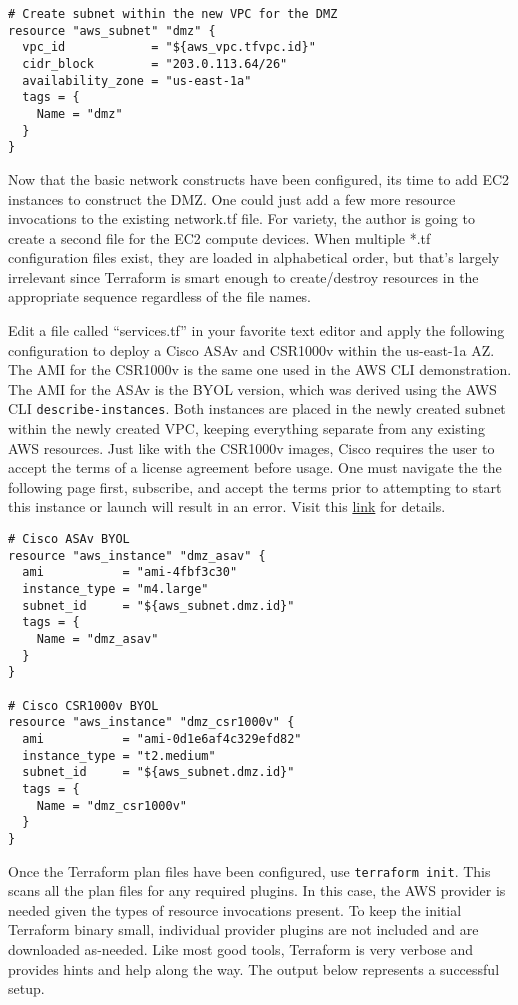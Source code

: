 \begin{verbatim}
# Create subnet within the new VPC for the DMZ
resource "aws_subnet" "dmz" {
  vpc_id            = "${aws_vpc.tfvpc.id}"
  cidr_block        = "203.0.113.64/26"
  availability_zone = "us-east-1a"
  tags = {
    Name = "dmz"
  }
}
\end{verbatim}

Now that the basic network constructs have been configured, its time to add
EC2 instances to construct the DMZ\@. One could just add a few more resource
invocations to the existing network.tf file. For variety, the author is going
to create a second file for the EC2 compute devices. When multiple *.tf
configuration files exist, they are loaded in alphabetical order, but that's
largely irrelevant since Terraform is smart enough to create/destroy resources
in the appropriate sequence regardless of the file names.

Edit a file called ``services.tf'' in your favorite text editor and apply the
following configuration to deploy a Cisco ASAv and CSR1000v within the
us-east-1a AZ\@. The AMI for the CSR1000v is the same one used in the AWS CLI
demonstration. The AMI for the ASAv is the BYOL version, which was derived
using the AWS CLI \verb|describe-instances|. Both instances are placed in the newly
created subnet within the newly created VPC, keeping everything separate from
any existing AWS resources. Just like with the CSR1000v images, Cisco requires
the user to accept the terms of a license agreement before usage. 
One must navigate the the following page first, subscribe, and accept the
terms prior to attempting to start this instance or launch will result in an
error. Visit this
\href{https://aws.amazon.com/marketplace/pp/B00WRGASUC}{link} for details.

\begin{verbatim}
# Cisco ASAv BYOL
resource "aws_instance" "dmz_asav" {
  ami           = "ami-4fbf3c30"
  instance_type = "m4.large"
  subnet_id     = "${aws_subnet.dmz.id}"
  tags = {
    Name = "dmz_asav"
  }
}

# Cisco CSR1000v BYOL
resource "aws_instance" "dmz_csr1000v" {
  ami           = "ami-0d1e6af4c329efd82"
  instance_type = "t2.medium"
  subnet_id     = "${aws_subnet.dmz.id}"
  tags = {
    Name = "dmz_csr1000v"
  }
}
\end{verbatim}

Once the Terraform plan files have been configured, use \verb|terraform init|.
This scans all the plan files for any required plugins. In this case, the AWS
provider is needed given the types of resource invocations present. To keep
the initial Terraform binary small, individual provider plugins are not
included and are downloaded as-needed. Like most good tools, Terraform is very
verbose and provides hints and help along the way. The output below represents
a successful setup.

